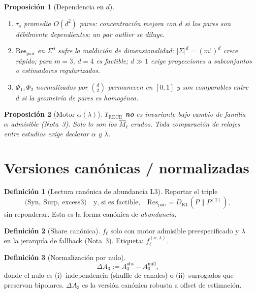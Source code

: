 \documentclass[11pt,a4paper]{article}
\theoremstyle{definition}
\newtheorem{definition}{Definici\'on}[section]
\theoremstyle{plain}
\newtheorem{proposition}{Proposici\'on}[section]
\theoremstyle{remark}
\newcommand{\Res}{\mathrm{Res}}
\newcommand{\RECD}{\mathrm{RECD}}
\newcommand{\Syn}{\mathrm{Syn}}
\newcommand{\Surp}{\mathrm{Surp}}
\newcommand{\excess}{\mathrm{excess3}}
\newcommand{\KL}{D_{\mathrm{KL}}}
\newcommand{\ts}{\tau_s}
\begin{document}
\begin{proposition}[Dependencia en $d$]
\label{prop:d}
\begin{enumerate}[label=(\roman*)]
  \item $\ts$ promedia $O(d^2)$ pares: concentraci\'on mejora con $d$
  si los pares son d\'ebilmente dependientes; un par outlier se diluye.
  \item $\Res_{\mathrm{pair}}$ en $\Sigma^d$ sufre la maldici\'on de
  dimensionalidad: $|\Sigma|^d=(m!)^d$ crece r\'apido; para $m=3$, $d=4$
  es factible; $d\gg 1$ exige proyecciones a subconjuntos o estimadores
  regularizados.
  \item $\Phi_1,\Phi_2$ normalizados por $\binom{d}{2}$ permanecen en
  $[0,1]$ y son comparables entre $d$ si la geometr\'ia de pares es
  homog\'enea.
\end{enumerate}
\end{proposition}

\begin{proposition}[Motor $\alpha(\lambda)$]
\label{prop:alpha_cov}
$T_{\RECD}$ \textbf{no} es invariante bajo cambio de familia $\alpha$
admisible (Nota~3). Solo lo son los $\widehat{M}_\ell$ crudos. Toda
comparaci\'on de relojes entre estudios exige declarar $\alpha$ y
$\lambda$.
\end{proposition}

\section{Versiones can\'onicas / normalizadas}
\label{sec:canonical}

\begin{definition}[Lectura can\'onica de abundancia L3]
\label{def:can_A3}
Reportar el triple
\begin{equation}
\bigl(\Syn,\ \Surp,\ \excess\bigr)
\quad\text{y, si es factible,}\quad
\Res_{\mathrm{pair}}=\KL(P\|P^{(2)}),
\end{equation}
sin reponderar. Esta es la forma can\'onica de \emph{abundancia}.
\end{definition}

\begin{definition}[Share can\'onica]
\label{def:can_f}
$f_\ell$ solo con motor admisible preespecificado y $\lambda$ en la
jerarqu\'ia de fallback (Nota~3). Etiqueta:
$f_\ell^{(\alpha,\lambda)}$.
\end{definition}

\begin{definition}[Normalizaci\'on por nulo]
\label{def:nullnorm}
\begin{equation}
\Delta A_3
:= A_3^{\mathrm{obs}}-A_3^{\mathrm{null}},
\end{equation}
donde el nulo es (i)~independencia (shuffle de canales) o
(ii)~surrogados que preservan bipolares. $\Delta A_3$ es la versi\'on
can\'onica robusta a offset de estimaci\'on.
\end{definition}
\end{document}
